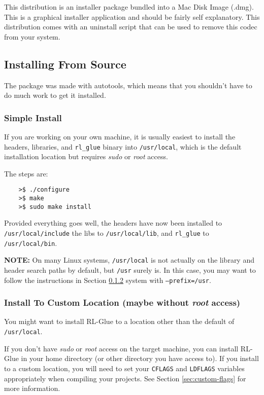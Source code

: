\documentclass[11pt]{article}
\begin{document}
This distribution is an installer package bundled into a Mac Disk Image (.dmg).  This is a graphical installer application and should be fairly self explanatory. This distribution comes with an uninstall script that can be used to remove this codec from your system.

\subsection{Installing From Source}
The package was made with autotools, which means that you shouldn't have to do much work to get it installed.  

\subsubsection{Simple Install}
If you are working on your own machine, it is usually easiest to install the headers, libraries, and \texttt{rl\_glue} binary into \texttt{/usr/local}, which is the default 
installation location but requires \textit{sudo} or \textit{root} access.

The steps are:
\begin{verbatim}
	>$ ./configure
	>$ make
	>$ sudo make install
\end{verbatim}

Provided everything goes well, the headers have now been installed to \texttt{/usr/local/include} the libs to \texttt{/usr/local/lib}, and \texttt{rl\_glue} to \texttt{/usr/local/bin}.

\textbf{NOTE:} On many Linux systems, \texttt{/usr/local} is not actually on the library and header search paths by default, but \texttt{/usr} surely is. In this case, you may want to follow the instructions in Section \ref{custom-install-location} system with \texttt{--prefix=/usr}.


\subsubsection{Install To Custom Location (maybe without \textit{root} access)}
\label{custom-install-location}
You might want to install RL-Glue to a location other than the default of \texttt{/usr/local}.

If you don't have \textit{sudo} or \textit{root} access on the target machine, you can install RL-Glue in your home directory (or other directory you have access to).
If you install to a custom location, you will need to set your \texttt{CFLAGS} and \texttt{LDFLAGS} variables appropriately when compiling your projects. See Section \ref{sec:custom-flags} for more information.
\end{document}
